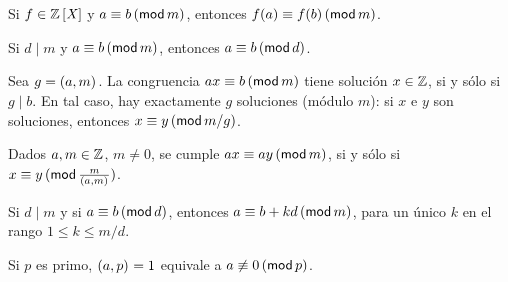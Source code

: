 \begin{ejerCongruencias}
	Si $f\in\polinomios\Enteros$ y $a\equiv b\tmodulo[m]$, entonces
	$f(a)\equiv f(b)\tmodulo[m]$.
\end{ejerCongruencias}

\begin{ejerCongruencias}
	Si $d\mid m$ y $a\equiv b\tmodulo[m]$, entonces $a\equiv b\tmodulo[d]$.
\end{ejerCongruencias}

\begin{ejerCongruencias}
	Sea $g=\mcd{a,m}$. La congruencia $ax\equiv b\tmodulo[m]$ tiene
	soluci\'on $x\in\Enteros$, si y s\'olo si $g\mid b$. En tal caso,
	hay exactamente $g$ soluciones (m\'odulo $m$):
	si $x$ e $y$ son soluciones, entonces $x\equiv y\tmodulo[m/g]$.
\end{ejerCongruencias}

\begin{ejerCongruencias}
	Dados $a,m\in\Enteros$, $m\neq 0$, se cumple $ax\equiv ay\tmodulo[m]$,
	si y s\'olo si $x\equiv y\tmodulo[\tfrac m{\mcd{a,m}}]$.
\end{ejerCongruencias}

\begin{ejerCongruencias}
	Si $d\mid m$ y si $a\equiv b\tmodulo[d]$, entonces
	$a\equiv b+kd\tmodulo[m]$, para un \'unico $k$ en el rango
	$1\leq k\leq m/d$.
\end{ejerCongruencias}

\begin{ejerCongruencias}
	Si $p$ es primo, $\mcd{a,p}=1$ equivale a $a\not\equiv 0\tmodulo[p]$.
\end{ejerCongruencias}



